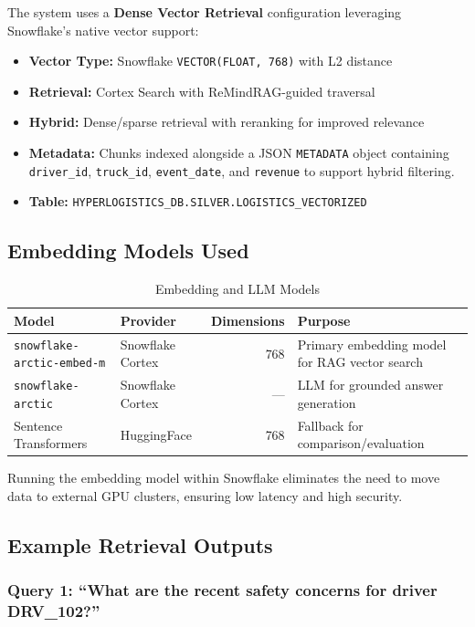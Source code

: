 \documentclass[14.5pt,letterpaper]{article}
\begin{document}
The system uses a \textbf{Dense Vector Retrieval} configuration leveraging Snowflake's native vector support:

\begin{itemize}
    \item \textbf{Vector Type:} Snowflake \texttt{VECTOR(FLOAT, 768)} with L2 distance
    \item \textbf{Retrieval:} Cortex Search with ReMindRAG-guided traversal
    \item \textbf{Hybrid:} Dense/sparse retrieval with reranking for improved relevance
    \item \textbf{Metadata:} Chunks indexed alongside a JSON \texttt{METADATA} object containing \texttt{driver\_id}, \texttt{truck\_id}, \texttt{event\_date}, and \texttt{revenue} to support hybrid filtering.
    \item \textbf{Table:} \texttt{HYPERLOGISTICS\_DB.SILVER.LOGISTICS\_VECTORIZED}
\end{itemize}

\subsection{Embedding Models Used}

\begin{table}[H]
\centering
\caption{Embedding and LLM Models}
\begin{tabular}{@{}llrl@{}}
\toprule
\textbf{Model} & \textbf{Provider} & \textbf{Dimensions} & \textbf{Purpose} \\
\midrule
\texttt{snowflake-arctic-embed-m} & Snowflake Cortex & 768 & Primary embedding model for RAG vector search \\
\texttt{snowflake-arctic} & Snowflake Cortex & --- & LLM for grounded answer generation \\
Sentence Transformers & HuggingFace & 768 & Fallback for comparison/evaluation \\
\bottomrule
\end{tabular}
\end{table}

Running the embedding model within Snowflake eliminates the need to move data to external GPU clusters, ensuring low latency and high security.

\subsection{Example Retrieval Outputs}

\subsubsection{Query 1: ``What are the recent safety concerns for driver DRV\_102?''}
\end{document}
